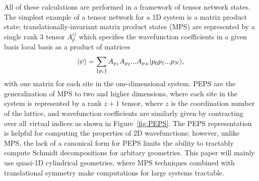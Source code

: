 All of these calculations are performed in a framework of tensor network states.
The simplest example of a tensor network for a 1D system is a matrix
product state; translationally-invariant matrix product states (MPS)
are represented by a single rank 3 tensor $A_p^{ij}$ which specifies
the wavefunction coefficients in a given basis local basis as a
product of matrices $$\vert \psi \rangle = \sum\limits_{\{p_i\}} A_{p_1}
A_{p_2} ... A_{p_N} \vert p_0 p_1 ... p_N \rangle,$$ with one matrix for each
site in the one-dimensional system.
PEPS are the generalization of MPS to two and higher dimensions, where
each site in the system is represented by a rank $z+1$ tensor, where
$z$ is the coordination number of the lattice, and wavefunction
coefficients are similarly given by contracting over all virtual
indices as shown in Figure~\ref{fig:PEPS}.\cite{verstraete2004}
The PEPS representation is helpful for computing the properties of 2D wavefunctions; however, unlike MPS, the lack of a canonical form for PEPS limits the ability to tractably compute Schmidt decompositions for arbitary geometries. This paper will mainly use quasi-1D cylindrical geometries, where  MPS techniques combined with translational symmetry make computations for large systems tractable.